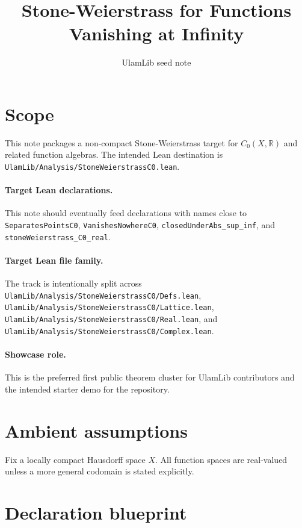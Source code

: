 \documentclass[11pt]{article}
\title{Stone-Weierstrass for Functions Vanishing at Infinity}
\author{UlamLib seed note}
\date{}
\begin{document}
\maketitle

\section{Scope}

This note packages a non-compact Stone-Weierstrass target for
$C_0(X, \mathbb{R})$ and related function algebras. The intended Lean
destination is \texttt{UlamLib/Analysis/StoneWeierstrassC0.lean}.

\paragraph{Target Lean declarations.}
This note should eventually feed declarations with names close to
\texttt{SeparatesPointsC0}, \texttt{VanishesNowhereC0},
\texttt{closedUnderAbs\_sup\_inf}, and \texttt{stoneWeierstrass\_C0\_real}.

\paragraph{Target Lean file family.}
The track is intentionally split across
\texttt{UlamLib/Analysis/StoneWeierstrassC0/Defs.lean},
\texttt{UlamLib/Analysis/StoneWeierstrassC0/Lattice.lean},
\texttt{UlamLib/Analysis/StoneWeierstrassC0/Real.lean}, and
\texttt{UlamLib/Analysis/StoneWeierstrassC0/Complex.lean}.

\paragraph{Showcase role.}
This is the preferred first public theorem cluster for UlamLib contributors and
the intended starter demo for the repository.

\section{Ambient assumptions}

Fix a locally compact Hausdorff space $X$. All function spaces are real-valued
unless a more general codomain is stated explicitly.

\section{Declaration blueprint}
\end{document}
